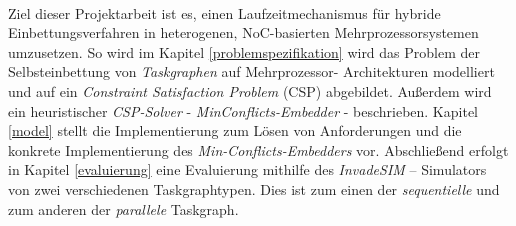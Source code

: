 \\
Ziel dieser Projektarbeit ist es, einen Laufzeitmechanismus für hybride
Einbettungsverfahren in heterogenen, NoC-basierten Mehrprozessorsystemen
umzusetzen. So wird im Kapitel \ref{problemspezifikation} wird das Problem der Selbsteinbettung von \textit{Taskgraphen} auf Mehrprozessor-
Architekturen modelliert und auf ein \textit{Constraint Satisfaction Problem} (CSP) abgebildet. Außerdem wird ein heuristischer \textit{CSP-Solver} - \textit{MinConflicts-Embedder} - beschrieben. Kapitel \ref{model} stellt die Implementierung zum Lösen von Anforderungen und die konkrete Implementierung des \textit{Min-Conflicts-Embedders} vor. Abschließend erfolgt in Kapitel \ref{evaluierung} eine Evaluierung mithilfe des \textit{InvadeSIM} -- Simulators \cite{cf:MPSoCs} von zwei verschiedenen Taskgraphtypen. Dies ist zum einen der \textit{sequentielle} und zum anderen der \textit{parallele} Taskgraph.
